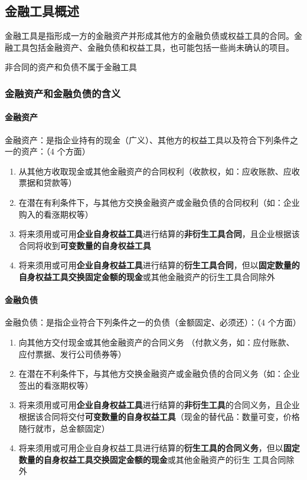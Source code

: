 \documentclass[UTF8,12pt]{ctexart}
\numberwithin{equation}{section} %
\numberwithin{figure}{section}
\numberwithin{table}{section}
\begin{document}
	\subsection{金融工具概述}
	金融工具是指形成一方的金融资产并形成其他方的金融负债或权益工具的合同。金融工具包括金融资产、金融负债和权益工具，也可能包括一些尚未确认的项目。
	
	非合同的资产和负债不属于金融工具
	
	\subsubsection{金融资产和金融负债的含义}
	
	\paragraph{金融资产}
	金融资产：是指企业持有的现金（广义）、其他方的权益工具以及符合下列条件之一的资产：（4 个方面）
	\begin{enumerate}
		\item 从其他方收取现金或其他金融资产的合同权利（收款权，如：应收账款、应收票据和贷款等）
		
		\item 在潜在有利条件下，与其他方交换金融资产或金融负债的合同权利（如：企业购入的看涨期权等）
		
		\item 将来须用或可用\textbf{企业自身权益工具}进行结算的\textbf{非衍生工具合同}，且企业根据该合同将收到\textbf{可变数量的自身权益工具}
		
		\item 将来须用或可用\textbf{企业自身权益工具}进行结算的\textbf{衍生工具合同}，但以\textbf{固定数量的自身权益工具交换固定金额的现金}或其他金融资产的衍生工具合同除外
	\end{enumerate}
	
	\paragraph{金融负债}
	
	金融负债：是指企业符合下列条件之一的负债（金额固定、必须还）：（4 个方面）
	\begin{enumerate}
		\item 向其他方交付现金或其他金融资产的合同义务
		（付款义务，如：应付账款、应付票据、发行公司债券等）
		
		\item 在潜在不利条件下，与其他方交换金融资产或金融负债的合同义务（如：企业签出的看涨期权等）
		
		\item 将来须用或可用\textbf{企业自身权益工具}进行结算的\textbf{非衍生工具}的合同义务，且企业根据该合同将交付\textbf{可变数量的自身权益工具}（现金的替代品：数量可变，价格随行就市，总金额固定）
		
		\item 将来须用或可用企业自身权益工具进行结算的\textbf{衍生工具的合同义务}，但以\textbf{固定数量的自身权益工具交换固定金额的现金}或其他金融资产的衍生 工具合同除外
	\end{enumerate}
\end{document}
